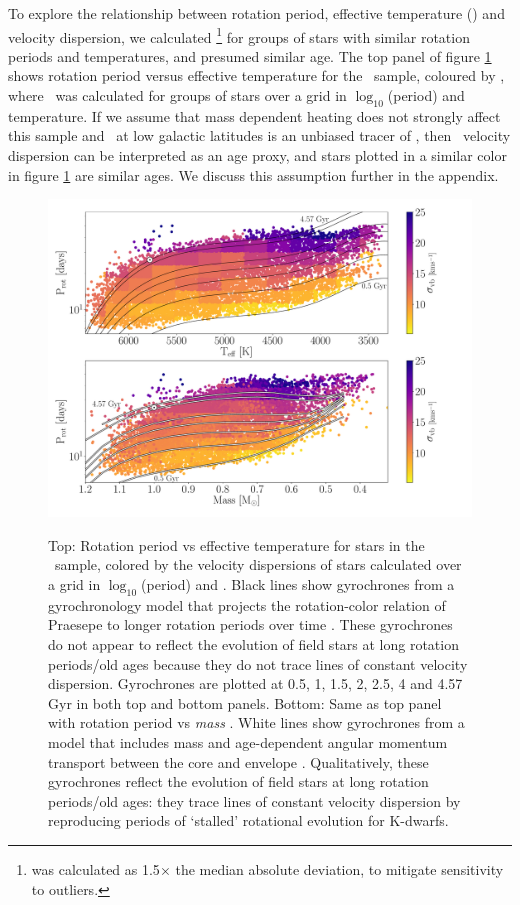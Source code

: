 To explore the relationship between rotation period, effective temperature
(\teff ) and velocity dispersion, we calculated \sigmavb \footnote{\sigmavb
was calculated as 1.5$\times$ the median absolute deviation, to mitigate
sensitivity to outliers.} for groups of stars with similar rotation periods
and temperatures, and presumed similar age.
The top panel of figure \ref{fig:vplot} shows rotation period versus effective
temperature for the \mct\ sample, coloured by \sigmavb, where \sigmavb\ was
calculated for groups of stars over a grid in $\log_{10}$(period) and
temperature.
If we assume that mass dependent heating does not strongly affect this sample
and \vb\ at low galactic latitudes is an unbiased tracer of \vz, then \vb\
velocity dispersion can be interpreted as an age proxy, and stars plotted in a
similar color in figure \ref{fig:vplot} are similar ages.
We discuss this assumption further in the appendix.
\begin{figure}
  \caption{
    Top: Rotation period vs effective temperature for stars in the \mct\
    sample, colored by the velocity dispersions of stars calculated over a
    grid in $\log_{10}$(period) and \teff.
    Black lines show gyrochrones from a gyrochronology model that projects the
    rotation-color relation of
    Praesepe to longer rotation periods over time \citep{angus2019}.
    These gyrochrones do not appear to reflect the evolution of field stars at
    long rotation periods/old ages because they do not trace lines of constant
    velocity dispersion.
    Gyrochrones are plotted at 0.5, 1, 1.5, 2, 2.5, 4 and 4.57 Gyr in both top
    and bottom panels.
    Bottom: Same as top panel with rotation period vs {\it mass}
    \citep[from][]{berger2020}.
    White lines show gyrochrones from a model that includes mass and
    age-dependent angular momentum transport between the core and envelope
    \citep{spada2019}.
    Qualitatively, these gyrochrones reflect the evolution of field
    stars at long rotation periods/old ages: they trace lines of constant
    velocity dispersion by reproducing periods of `stalled' rotational
    evolution for K-dwarfs.
}
  \centering
    \includegraphics[width=1\textwidth]{main_figure}
\label{fig:vplot}
\end{figure}

